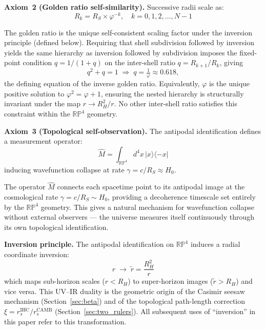 \documentclass[12pt,a4paper]{article}
\begin{document}
\textbf{Axiom~2 (Golden ratio self-similarity).} Successive radii scale as:
\begin{equation}
  R_k = R_S \times \varphi^{-k}, \quad k = 0,1,2,\ldots,N-1
\end{equation}

The golden ratio is the unique self-consistent scaling factor under the
inversion principle (defined below). Requiring that shell subdivision
followed by inversion yields the same hierarchy as inversion followed
by subdivision imposes the fixed-point condition $q = 1/(1+q)$ on the
inter-shell ratio $q = R_{k+1}/R_k$, giving
\begin{equation}
  q^2 + q = 1 \;\Longrightarrow\; q = \tfrac{1}{\varphi} \approx 0.618,
  \label{eq:phi_fixedpoint}
\end{equation}
the defining equation of the inverse golden ratio. Equivalently,
$\varphi$ is the unique positive solution to $\varphi^2 = \varphi + 1$,
ensuring the nested hierarchy is structurally invariant under the map
$r \to R_H^2/r$. No other inter-shell ratio satisfies this constraint
within the $\mathbb{RP}^4$ geometry.

\textbf{Axiom~3 (Topological self-observation).} The antipodal identification
defines a measurement operator:
\begin{equation}
  \hat{M} = \int_{\mathbb{RP}^4} d^4x\, |x\rangle\langle -x|
\end{equation}
inducing wavefunction collapse at rate $\gamma = c/R_S \approx H_0$.

The operator $\hat{M}$ connects each spacetime point to its antipodal image
at the cosmological rate $\gamma = c/R_S \sim H_0$, providing a decoherence
timescale set entirely by the $\mathbb{RP}^4$ geometry. This gives a natural
mechanism for wavefunction collapse without external observers --- the
universe measures itself continuously through its own topological
identification.

\textbf{Inversion principle.} The antipodal identification on $\mathbb{RP}^4$
induces a radial coordinate inversion:
\begin{equation}
  r \;\longrightarrow\; \tilde{r} = \frac{R_H^2}{r}
\end{equation}
which maps sub-horizon scales ($r < R_H$) to super-horizon images
($\tilde{r} > R_H$) and vice versa. This UV--IR duality is the geometric
origin of the Casimir seesaw mechanism (Section~\ref{sec:beta})
and of the topological path-length correction $\xi = r_s^\mathrm{IHC}/r_s^\mathrm{CAMB}$
(Section~\ref{sec:two_rulers}). All subsequent uses of ``inversion'' in this
paper refer to this transformation.
\end{document}
